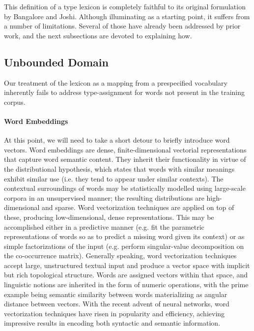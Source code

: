 This definition of a type lexicon is completely faithful to its original formulation by Bangalore and Joshi.
Although illuminating as a starting point, it suffers from a number of limitations.
Several of those have already been addressed by prior work, and the next subsections are devoted to explaining how.

\subsection{Unbounded Domain}
Our treatment of the lexicon as a mapping from a prespecified vocabulary inherently fails to address type-assignment for words not present in the training corpus.

\paragraph{Word Embeddings}
At this point, we will need to take a short detour to briefly introduce word vectors.
Word embeddings are dense, finite-dimensional vectorial representations that capture word semantic content. 
They inherit their functionality in virtue of the distributional hypothesis, which states that words with similar meanings exhibit similar use (i.e. they tend to appear under similar contexts).
The contextual surroundings of words may be statistically modelled using large-scale corpora in an unsupervised manner; the resulting distributions are high-dimensional and sparse.
Word vectorization techniques are applied on top of these, producing low-dimensional, dense representations.
This may be accomplished either in a predictive manner (e.g. fit the parametric representations of words so as to predict a missing word given its context) or as simple factorizations of the input (e.g. perform singular-value decomposition on the co-occurrence matrix).
Generally speaking, word vectorization techniques accept large, unstructured textual input and produce a vector space with implicit but rich topological structure. 
Words are assigned vectors within that space, and linguistic notions are inherited in the form of numeric operations, with the prime example being semantic similarity between words materializing as angular distance between vectors.
With the recent advent of neural networks, word vectorization techniques have risen in popularity and efficiency, achieving impressive results in encoding both syntactic and semantic information.

